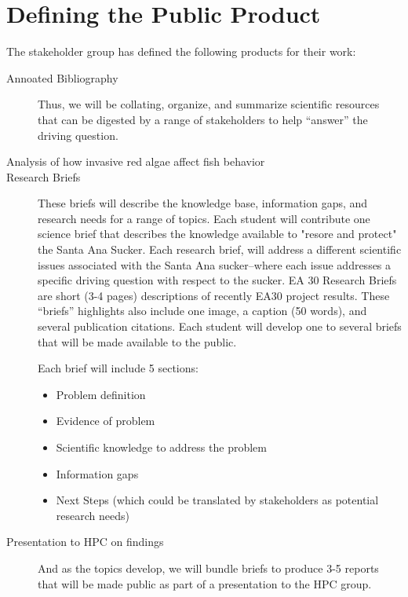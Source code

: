 \documentclass{article}\usepackage[]{graphicx}\usepackage[]{color}
\begin{document}
\section{Defining the Public Product}

The stakeholder group has defined the following products for their work:

\begin{description}
  \item[Annoated Bibliography] Thus, we will be collating, organize, and summarize scientific resources that can be digested by a range of stakeholders to help ``answer'' the driving question. 
  \item[Analysis of how invasive red algae affect fish behavior]
  \item[Research Briefs] These briefs will describe the knowledge base, information gaps, and research needs for a range of topics. Each student will contribute one science brief that describes the knowledge available to "resore and protect" the Santa Ana Sucker. Each research brief, will address a different scientific issues associated with the Santa Ana sucker--where each issue addresses a specific driving question with respect to the sucker. EA 30 Research Briefs are short (3-4 pages) descriptions of recently EA30 project results. These ``briefs'' highlights also include one image, a caption (50 words), and several publication citations. Each student will develop one to several briefs that will be made available to the public.
  
Each brief will include 5 sections:

\begin{itemize}
  \item Problem definition
  \item Evidence of problem
  \item Scientific knowledge to address the problem
  \item Information gaps
  \item Next Steps (which could be translated by stakeholders as potential research needs)
\end{itemize}

  \item[Presentation to HPC on findings] And as the topics develop, we will bundle briefs to produce 3-5 reports that will be made public as part of a presentation to the HPC group.
\end{description}
\end{document}
